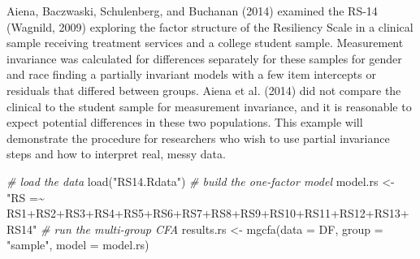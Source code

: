 \documentclass[
  man]{apa6}
\newenvironment{Shaded}{\begin{snugshade}}{\end{snugshade}}
\newcommand{\AttributeTok}[1]{\textcolor[rgb]{0.77,0.63,0.00}{#1}}
\newcommand{\CommentTok}[1]{\textcolor[rgb]{0.56,0.35,0.01}{\textit{#1}}}
\newcommand{\FunctionTok}[1]{\textcolor[rgb]{0.00,0.00,0.00}{#1}}
\newcommand{\NormalTok}[1]{#1}
\newcommand{\OtherTok}[1]{\textcolor[rgb]{0.56,0.35,0.01}{#1}}
\newcommand{\SpecialCharTok}[1]{\textcolor[rgb]{0.00,0.00,0.00}{#1}}
\newcommand{\StringTok}[1]{\textcolor[rgb]{0.31,0.60,0.02}{#1}}
\begin{document}
Aiena, Baczwaski, Schulenberg, and Buchanan (2014) examined the RS-14 (Wagnild, 2009) exploring the factor structure of the Resiliency Scale in a clinical sample receiving treatment services and a college student sample. Measurement invariance was calculated for differences separately for these samples for gender and race finding a partially invariant models with a few item intercepts or residuals that differed between groups. Aiena et al. (2014) did not compare the clinical to the student sample for measurement invariance, and it is reasonable to expect potential differences in these two populations. This example will demonstrate the procedure for researchers who wish to use partial invariance steps and how to interpret real, messy data.

\small

\begin{Shaded}
\begin{Highlighting}[]
\CommentTok{\# load the data}
\FunctionTok{load}\NormalTok{(}\StringTok{"RS14.Rdata"}\NormalTok{)}
\CommentTok{\# build the one{-}factor model }
\NormalTok{model.rs }\OtherTok{\textless{}{-}} \StringTok{"RS =\textasciitilde{} RS1+RS2+RS3+RS4+RS5+RS6+RS7+RS8+RS9+RS10+RS11+RS12+RS13+RS14"}
\CommentTok{\# run the multi{-}group CFA}
\NormalTok{results.rs }\OtherTok{\textless{}{-}} \FunctionTok{mgcfa}\NormalTok{(}\AttributeTok{data =}\NormalTok{ DF, }
                    \AttributeTok{group =} \StringTok{"sample"}\NormalTok{, }
                    \AttributeTok{model =}\NormalTok{ model.rs)}
\end{Highlighting}
\end{Shaded}

\normalsize

\small

\begin{Shaded}
\end{Shaded}

\normalsize
\end{document}
